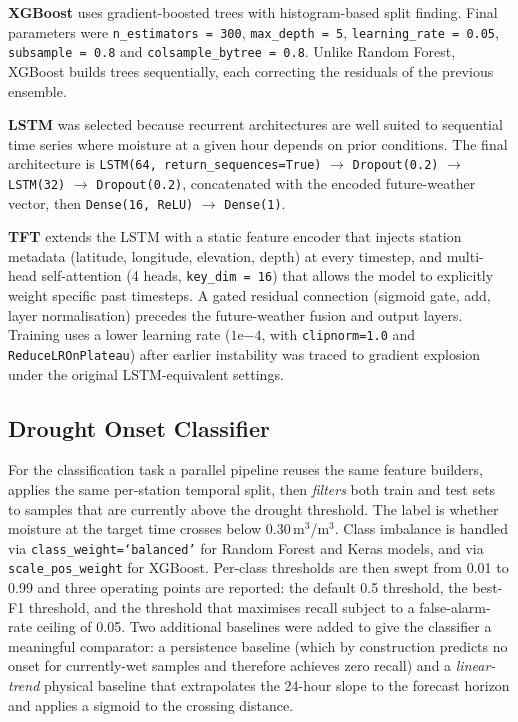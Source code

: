 \documentclass[12pt, a4paper]{article}
\begin{document}
\textbf{XGBoost} uses gradient-boosted trees with histogram-based split finding.
Final parameters were \texttt{n\_estimators = 300}, \texttt{max\_depth = 5},
\texttt{learning\_rate = 0.05}, \texttt{subsample = 0.8} and
\texttt{colsample\_bytree = 0.8}. Unlike Random Forest, XGBoost builds trees
sequentially, each correcting the residuals of the previous ensemble.

\textbf{LSTM} was selected because recurrent architectures are well suited to
sequential time series where moisture at a given hour depends on prior
conditions. The final architecture is \texttt{LSTM(64, return\_sequences=True)}
$\to$ \texttt{Dropout(0.2)} $\to$ \texttt{LSTM(32)} $\to$ \texttt{Dropout(0.2)},
concatenated with the encoded future-weather vector, then
\texttt{Dense(16, ReLU)} $\to$ \texttt{Dense(1)}.

\textbf{TFT} extends the LSTM with a static feature encoder that injects
station metadata (latitude, longitude, elevation, depth) at every timestep,
and multi-head self-attention (4 heads, \texttt{key\_dim = 16}) that allows
the model to explicitly weight specific past timesteps. A gated residual
connection (sigmoid gate, add, layer normalisation) precedes the future-weather
fusion and output layers. Training uses a lower learning rate
($1\mathrm{e}{-4}$, with \texttt{clipnorm=1.0} and \texttt{ReduceLROnPlateau})
after earlier instability was traced to gradient explosion under the original
LSTM-equivalent settings.

\subsection{Drought Onset Classifier}

For the classification task a parallel pipeline reuses the same feature
builders, applies the same per-station temporal split, then \emph{filters}
both train and test sets to samples that are currently above the drought
threshold. The label is whether moisture at the target time crosses below
0.30\,m$^3$/m$^3$. Class imbalance is handled via
\texttt{class\_weight=`balanced'} for Random Forest and Keras models, and via
\texttt{scale\_pos\_weight} for XGBoost. Per-class thresholds are then swept
from 0.01 to 0.99 and three operating points are reported: the default
0.5 threshold, the best-F1 threshold, and the threshold that maximises recall
subject to a false-alarm-rate ceiling of 0.05. Two additional baselines were
added to give the classifier a meaningful comparator: a persistence baseline
(which by construction predicts no onset for currently-wet samples and therefore
achieves zero recall) and a \emph{linear-trend} physical baseline that
extrapolates the 24-hour slope to the forecast horizon and applies a sigmoid
to the crossing distance.
\end{document}

